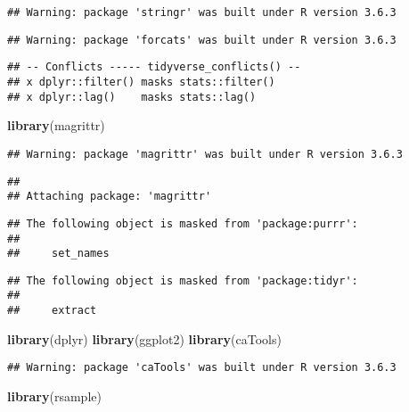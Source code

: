 \documentclass[
]{article}
\newenvironment{Shaded}{\begin{snugshade}}{\end{snugshade}}
\newcommand{\KeywordTok}[1]{\textcolor[rgb]{0.13,0.29,0.53}{\textbf{#1}}}
\newcommand{\NormalTok}[1]{#1}
\begin{document}
\begin{verbatim}
## Warning: package 'stringr' was built under R version 3.6.3
\end{verbatim}

\begin{verbatim}
## Warning: package 'forcats' was built under R version 3.6.3
\end{verbatim}

\begin{verbatim}
## -- Conflicts ----- tidyverse_conflicts() --
## x dplyr::filter() masks stats::filter()
## x dplyr::lag()    masks stats::lag()
\end{verbatim}

\begin{Shaded}
\begin{Highlighting}[]
\KeywordTok{library}\NormalTok{(magrittr)}
\end{Highlighting}
\end{Shaded}

\begin{verbatim}
## Warning: package 'magrittr' was built under R version 3.6.3
\end{verbatim}

\begin{verbatim}
## 
## Attaching package: 'magrittr'
\end{verbatim}

\begin{verbatim}
## The following object is masked from 'package:purrr':
## 
##     set_names
\end{verbatim}

\begin{verbatim}
## The following object is masked from 'package:tidyr':
## 
##     extract
\end{verbatim}

\begin{Shaded}
\begin{Highlighting}[]
\KeywordTok{library}\NormalTok{(dplyr)}
\KeywordTok{library}\NormalTok{(ggplot2)}
\KeywordTok{library}\NormalTok{(caTools)}
\end{Highlighting}
\end{Shaded}

\begin{verbatim}
## Warning: package 'caTools' was built under R version 3.6.3
\end{verbatim}

\begin{Shaded}
\begin{Highlighting}[]
\KeywordTok{library}\NormalTok{(rsample)}
\end{Highlighting}
\end{Shaded}
\end{document}
